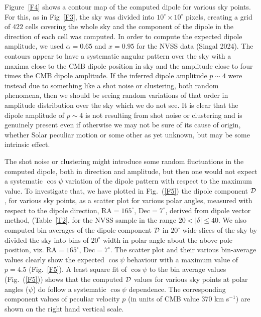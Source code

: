 \documentclass[fleqn,usenatbib]{mnras}
\begin{document}
Figure~\ref{F4} shows a contour map of the computed dipole for various sky points. For this, as in Fig~\ref{F3}, the sky was divided into $10^\circ \times 10^\circ$ pixels, creating a grid of $422$ cells covering the whole sky and the component of the dipole in the direction of each cell was computed. In order to compute the expected dipole amplitude, we used $\alpha=0.65$ and $x=0.95$ for the NVSS data (Singal 2024). The contours appear to have a systematic angular pattern over the sky with a maxima close to the CMB dipole position in sky and the amplitude close to four times the CMB dipole amplitude. If the inferred dipole amplitude $p \sim 4$ were instead due to something like a shot noise or clustering, both random phenomena, then we should be seeing random variations of that order in amplitude distribution over the sky which we do not see. It is clear that the dipole amplitude of $p \sim 4$ is not resulting from shot noise or clustering and is genuinely present even if otherwise we may not be sure of its cause of origin, whether Solar peculiar motion or some other as yet unknown, but may be some intrinsic effect.

The shot noise or clustering might introduce some random fluctuations in the computed dipole, both in direction and amplitude, but then one would not expect a systematic $\cos \psi$ variation of the dipole pattern with respect to the maximum value. To investigate that, we have plotted in Fig.~(\ref{F5}) the dipole component ${\cal D}$, for various sky points, as a scatter plot for various polar angles, measured with respect to the dipole direction,  RA$=165^{\circ}$, Dec$=7^{\circ}$, derived from dipole vector method, (Table~\ref{T2}, for the NVSS sample in the range $20<|{\delta}|\leq40$. 
We also computed bin averages of the dipole component ${\cal D}$ in $20^{\circ}$ wide slices of the sky by divided the sky into bins of $20^\circ$ width in polar angle about the above pole position, viz. RA$=165^{\circ}$, Dec$=7^{\circ}$. The scatter plot and their various bin-average values clearly show the expected $\cos\psi$ behaviour with a maximum value of $p=4.5$ (Fig.~\ref{F5}). 
A least square fit of $\cos \psi$ to the bin average values (Fig.~(\ref{F5})) shows that the computed ${\cal D}$ values for various sky points at polar angles ($\psi$) do follow a systematic $\cos\psi$ dependence. 
The corresponding component values of peculiar velocity $p$ (in units of CMB value 370 km s$^{-1}$) are shown on the right hand vertical scale.
\end{document}
